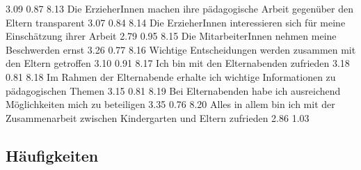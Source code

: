 \documentclass[12pt,a4paper]{article}
\begin{document}
 3.09
          0.87
8.13 Die ErzieherInnen machen ihre pädagogische Arbeit gegenüber
        den Eltern transparent                                                                                                                                                                                                                                            
 3.07
          0.84
8.14 Die ErzieherInnen interessieren sich für meine Einschätzung
        ihrer Arbeit  
 2.79
          0.95
8.15 Die MitarbeiterInnen nehmen meine Beschwerden ernst                                                                                                        
 3.26
          0.77
8.16 Wichtige Entscheidungen werden zusammen mit den Eltern
        getroffen                                                                                                
 3.10
          0.91
8.17 Ich bin mit den Elternabenden zufrieden                                              
 3.18
          0.81
8.18 Im Rahmen der Elternabende erhalte ich wichtige    
        Informationen zu pädagogischen Themen                                                                    
 3.15
          0.81
8.19 Bei Elternabenden habe ich ausreichend Möglichkeiten mich    
        zu beteiligen                                                                                 
 3.35
          0.76
8.20 Alles in allem bin ich mit der Zusammenarbeit zwischen  
        Kindergarten und Eltern zufrieden
 2.86
          1.03


\subsection{Häufigkeiten} 
\end{document}
